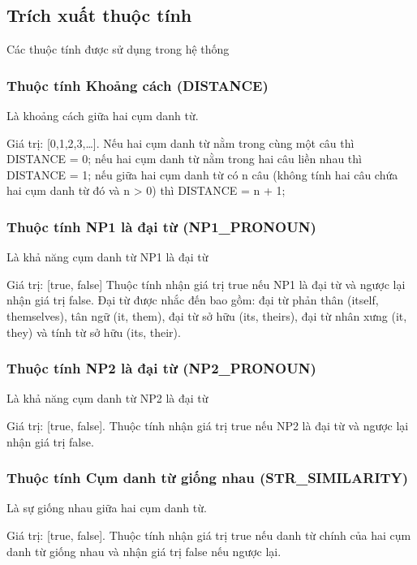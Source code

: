 \documentclass[12pt]{extarticle}
\begin{document}
		\subsection{Trích xuất thuộc tính}

			\begin{table}[]
				\centering
				
				\caption{Các thuộc tính được sử dụng trong hệ thống}
				\label{features_table}
			\end{table}

			\subsubsection*{Thuộc tính Khoảng cách (DISTANCE)}
				\par Là khoảng cách giữa hai cụm danh từ.
				\par Giá trị: [0,1,2,3,…]. Nếu hai cụm danh từ nằm trong cùng một câu thì DISTANCE = 0; nếu hai cụm danh từ nằm trong hai câu liền nhau thì DISTANCE = 1; nếu giữa hai cụm danh từ có n câu (không tính hai câu chứa hai cụm danh từ đó và n > 0) thì DISTANCE = n + 1;
 
			\subsubsection*{Thuộc tính NP1 là đại từ (NP1\_PRONOUN)}
				\par Là khả năng cụm danh từ NP1 là đại từ
				\par Giá trị: [true, false] Thuộc tính nhận giá trị true nếu NP1 là đại từ và ngược lại nhận giá trị false. Đại từ được nhắc đến bao gồm: đại từ phản thân (itself, themselves), tân ngữ (it, them), đại từ sở hữu (its, theirs), đại từ nhân xưng (it, they) và tính từ sở hữu (its, their).

			\subsubsection*{Thuộc tính NP2 là đại từ (NP2\_PRONOUN)}
				\par Là khả năng cụm danh từ NP2 là đại từ
				\par Giá trị: [true, false]. Thuộc tính nhận giá trị true nếu NP2 là đại từ và ngược lại nhận giá trị false.

			\subsubsection*{Thuộc tính Cụm danh từ giống nhau (STR\_SIMILARITY)}
				\par Là sự giống nhau giữa hai cụm danh từ.
				\par Giá trị: [true, false]. Thuộc tính nhận giá trị true nếu danh từ chính của hai cụm danh từ giống nhau và nhận giá trị false nếu ngược lại.
\end{document}
